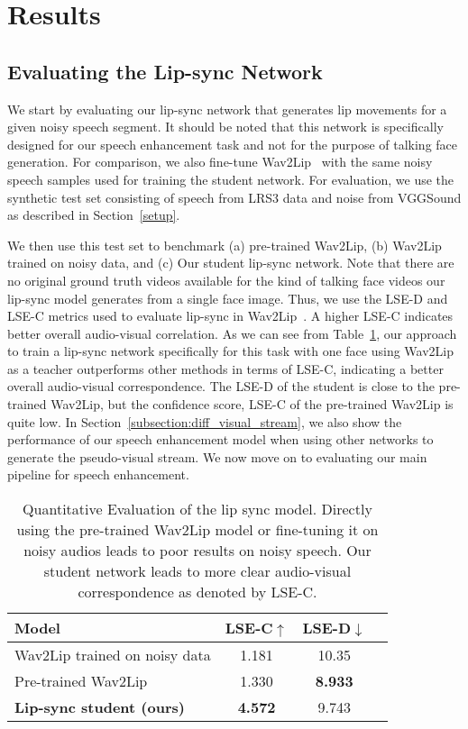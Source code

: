 \documentclass[10pt,twocolumn,letterpaper]{article}
\begin{document}
\section{Results}
\label{section:results}


\subsection{Evaluating the Lip-sync Network}
\label{subsection:lipsync_eval}

We start by evaluating our lip-sync network that generates lip movements for a given noisy speech segment. It should be noted that this network is specifically designed for our speech enhancement task and not for the purpose of talking face generation. For comparison, we also fine-tune Wav2Lip~\cite{wav2lip:2020} with the same noisy speech samples used for training the student network. For evaluation, we use the synthetic test set consisting of speech from LRS3 data and noise from VGGSound as described in Section~\ref{setup}.

We then use this test set to benchmark (a) pre-trained Wav2Lip, (b) Wav2Lip trained on noisy data, and (c) Our student lip-sync network. Note that there are no original ground truth videos available for the kind of talking face videos our lip-sync model generates from a single face image. Thus, we use the LSE-D and LSE-C metrics used to evaluate lip-sync in Wav2Lip~\cite{wav2lip:2020}. A higher LSE-C indicates better overall audio-visual correlation. As we can see from Table~\ref{table:lipsync_metric}, our approach to train a lip-sync network specifically for this task with one face using Wav2Lip as a teacher outperforms other methods in terms of LSE-C, indicating a better overall audio-visual correspondence. The LSE-D of the student is close to the pre-trained Wav2Lip, but the confidence score, LSE-C of the pre-trained Wav2Lip is quite low. In Section~\ref{subsection:diff_visual_stream}, we also show the performance of our speech enhancement model when using other networks to generate the pseudo-visual stream. We now move on to evaluating our main pipeline for speech enhancement. 

\begin{table}[ht]
    \centering
    \caption{Quantitative Evaluation of the lip sync model. Directly using the pre-trained Wav2Lip model or fine-tuning it on noisy audios leads to poor results on noisy speech. Our student network leads to more clear audio-visual correspondence as denoted by LSE-C.}
    \begin{tabular}{lccc}
    \hline
    \textbf{Model} & LSE-C$\uparrow$ & LSE-D$\downarrow$\\
    \hline
    Wav2Lip trained on noisy data & 1.181 &  10.35\\
    Pre-trained Wav2Lip & 1.330 & \textbf{8.933} \\
    \textbf{Lip-sync student (ours)} & \textbf{4.572} & 9.743\\
    
    \hline
    \end{tabular}
    \label{table:lipsync_metric}
\end{table}
\end{document}
